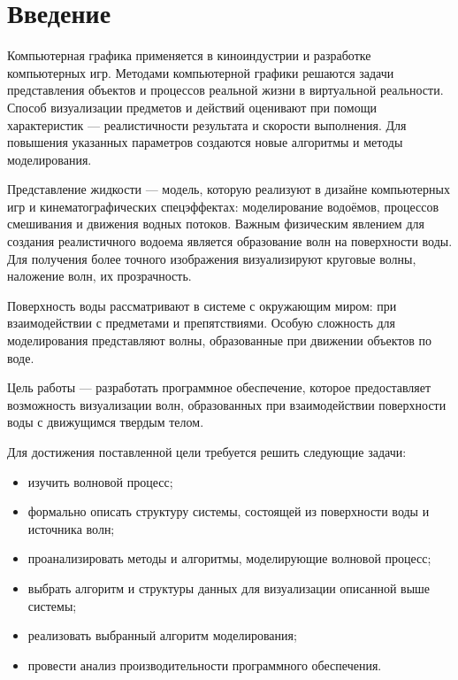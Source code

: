 \chapter*{Введение}

Компьютерная графика применяется в киноиндустрии и разработке компьютерных игр. Методами компьютерной графики решаются задачи представления объектов и процессов реальной жизни в виртуальной реальности. Способ визуализации предметов и действий оценивают при помощи характеристик --- реалистичности результата и скорости выполнения. Для повышения указанных параметров создаются новые алгоритмы и методы моделирования.

Представление жидкости --- модель, которую реализуют в дизайне компьютерных игр и кинематографических спецэффектах: моделирование водоёмов, процессов смешивания и движения водных потоков. Важным физическим явлением для создания реалистичного водоема является образование волн на поверхности воды. Для получения более точного изображения визуализируют круговые волны, наложение волн, их прозрачность.

Поверхность воды рассматривают в системе с окружающим миром: при взаимодействии с предметами и препятствиями. Особую сложность для моделирования представляют волны, образованные при движении объектов по воде.

Цель работы --- разработать программное обеспечение, которое предоставляет возможность визуализации волн, образованных при взаимодействии поверхности воды с движущимся твердым телом.

Для достижения поставленной цели требуется решить следующие задачи:

\begin{itemize}
	\item изучить волновой процесс;
	\item формально описать структуру системы, состоящей из поверхности воды и источника волн;
	\item проанализировать методы и алгоритмы, моделирующие волновой процесс;
	\item выбрать алгоритм и структуры данных для визуализации описанной выше системы;
	\item реализовать выбранный алгоритм моделирования;
	\item провести анализ производительности программного обеспечения.
\end{itemize}

